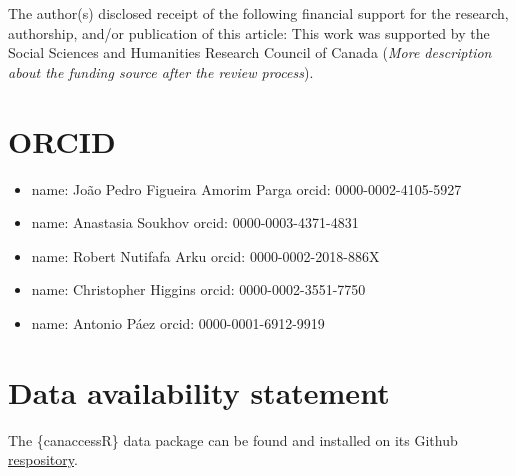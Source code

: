 \documentclass[Royal,times,sageh]{sagej}
\providecommand{\tightlist}{%
  \setlength{\itemsep}{0pt}\setlength{\parskip}{0pt}}
\begin{document}
The author(s) disclosed receipt of the following financial support for
the research, authorship, and/or publication of this article: This work
was supported by the Social Sciences and Humanities Research Council of
Canada (\emph{More description about the funding source after the review
process}).

\section{ORCID}\label{orcid}

\begin{itemize}
\tightlist
\item
  name: João Pedro Figueira Amorim Parga orcid: 0000-0002-4105-5927
\item
  name: Anastasia Soukhov orcid: 0000-0003-4371-4831
\item
  name: Robert Nutifafa Arku orcid: 0000-0002-2018-886X
\item
  name: Christopher Higgins orcid: 0000-0002-3551-7750
\item
  name: Antonio Páez orcid: 0000-0001-6912-9919
\end{itemize}

\section{Data availability statement}\label{data-availability-statement}

The \{canaccessR\} data package can be found and installed on its Github
\href{https://github.com/paezha/canaccessR}{respository}.



\end{document}
